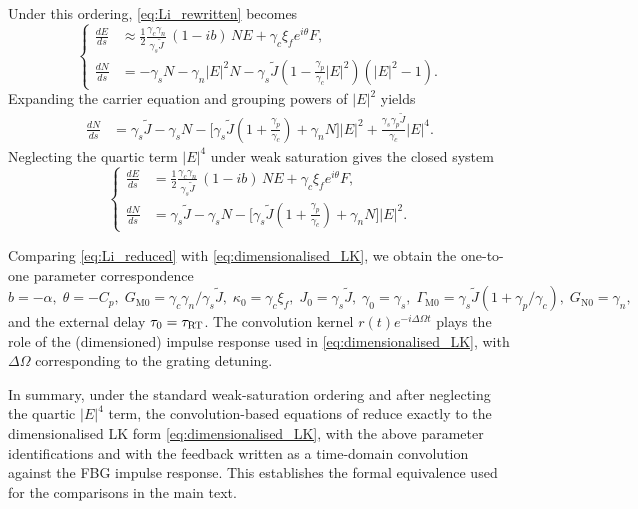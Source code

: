 Under this ordering, \eqref{eq:Li_rewritten} becomes
\begin{equation}
\label{eq:Li_leading}
\left\{
\begin{aligned}
\frac{d E}{d s} &\approx 
\frac{1}{2}\frac{\gamma_{c}\gamma_{n}}{\gamma_{s}\tilde{J}}\,(1-ib)\,N E
+ \gamma_{c}\xi_f e^{i\theta} F,\\[0.25em]
\frac{d N}{d s} &= -\gamma_s N - \gamma_n|E|^2 N 
- \gamma_s\tilde{J}\!\left(1-\frac{\gamma_p}{\gamma_c}|E|^2\right)\!(|E|^2-1).
\end{aligned}
\right.
\end{equation}
Expanding the carrier equation and grouping powers of $|E|^2$ yields
\begin{align*}
\frac{d N}{d s} 
&= \gamma_s\tilde{J} - \gamma_s N 
  - \Big[\gamma_s\tilde{J}\!\left(1+\tfrac{\gamma_p}{\gamma_c}\right)+\gamma_n N\Big]|E|^2
  + \frac{\gamma_s\gamma_p\tilde{J}}{\gamma_c}|E|^4.
\end{align*}
Neglecting the quartic term $|E|^4$ under weak saturation gives the closed system
\begin{equation}
\label{eq:Li_reduced}
\left\{
\begin{aligned}
\frac{d E}{d s} &= 
\frac{1}{2}\frac{\gamma_{c}\gamma_{n}}{\gamma_{s}\tilde{J}}\,(1-ib)\,N E
+ \gamma_{c}\xi_f e^{i\theta} F,\\
\frac{d N}{d s} &= \gamma_s\tilde{J} - \gamma_s N 
- \Big[\gamma_s\tilde{J}\!\left(1+\tfrac{\gamma_p}{\gamma_c}\right)+\gamma_n N\Big]|E|^2.
\end{aligned}
\right.
\end{equation}
%
\par
%
Comparing \eqref{eq:Li_reduced} with \eqref{eq:dimensionalised_LK}, we obtain the one-to-one parameter correspondence
%
$
b=-\alpha,\; \theta=-C_p,\; 
G_{\mathrm{M}0}=\gamma_c\gamma_n/\gamma_s\tilde{J},\;
\kappa_0=\gamma_c\xi_f,\;
J_0=\gamma_s\tilde{J},\; 
\gamma_0=\gamma_s,\; 
\Gamma_{\mathrm{M}0}=\gamma_s\tilde{J}\!\left(1+\gamma_p/\gamma_c\right),\;
G_{\mathrm{N}0}=\gamma_n,
$
%
and the external delay $\tau_0=\tau_{\rm RT}$. 
The convolution kernel $r(t)e^{-i\Delta\Omega t}$ plays the role of the (dimensioned) impulse response used in \eqref{eq:dimensionalised_LK}, with $\Delta\Omega$ corresponding to the grating detuning.
%
\par
%
In summary, under the standard weak-saturation ordering and after neglecting the quartic $|E|^4$ term, the convolution-based equations of \cite{li2012distributed,li2015chaotic,li2020stable} reduce exactly to the dimensionalised LK form \eqref{eq:dimensionalised_LK}, with the above parameter identifications and with the feedback written as a time-domain convolution against the FBG impulse response.
This establishes the formal equivalence used for the comparisons in the main text.
%
%
